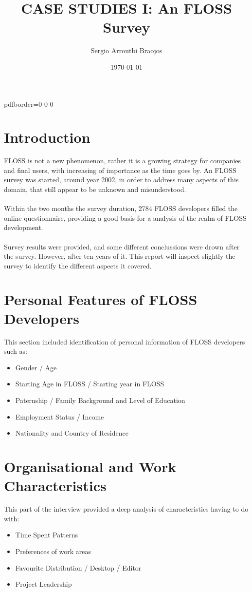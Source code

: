 \documentclass[11pt]{article}
\title{\textbf{CASE STUDIES I: An FLOSS Survey}}
\author{Sergio Arroutbi Braojos}
\date{\today}
\begin{document}
\maketitle

\hypersetup
{
pdfborder={0 0 0}
}

\section{Introduction}
FLOSS is not a new phenomenon, rather it is a growing strategy for companies and final users, with 
increasing of importance as the time goes by. An FLOSS survey was started, around year 2002, in order to address many aspects of this domain, that still appear to be unknown and misunderstood.\\
\\
Within the two months the survey duration, 2784 FLOSS developers filled the online questionnaire, providing a good basis for a analysis of the realm of FLOSS development.\\
\\
Survey results were provided, and some different conclussions were drown after the survey. However, after ten years of it. This report will inspect slightly the survey to identify the different aspects it covered.

\section{Personal Features of FLOSS Developers}
This section included identification of personal information of FLOSS developers such as:
\begin{itemize}\itemsep0pt
\item{Gender / Age}
\item{Starting Age in FLOSS / Starting year in FLOSS}
\item{Paternship / Family Background and Level of Education}
\item{Employment Status / Income}
\item{Nationality and Country of Residence}
\end{itemize}

\section{Organisational and Work Characteristics}
This part of the interview provided a deep analysis of characteristics having to do with:
\begin{itemize}\itemsep0pt
\item{Time Spent Patterns}
\item{Preferences of work areas}
\item{Favourite Distribution / Desktop / Editor}
\item{Project Leadership}
\end{itemize}
\end{document}
